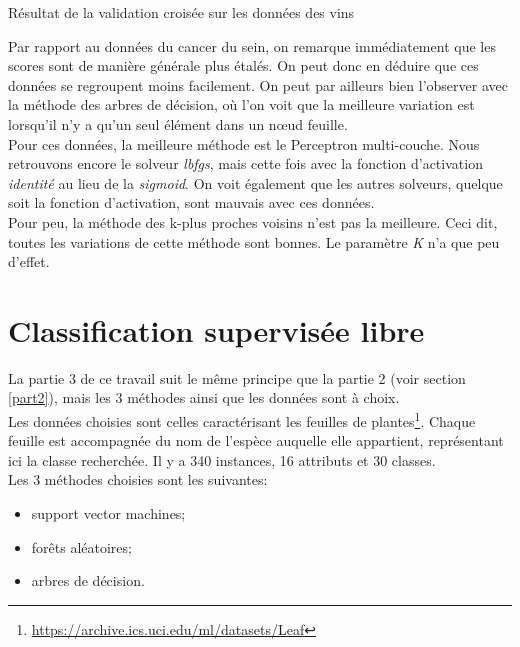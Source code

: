 \documentclass[11pt, a4paper]{article}
\begin{document}
\begin{table}[H]
    \begin{center}
    \end{center}
    \caption{Résultat de la validation croisée sur les données des vins}
    \label{Résultat de la validation croisée sur les données des vins}
\end{table}

Par rapport au données du cancer du sein,
on remarque immédiatement que les scores sont de manière générale plus étalés.
On peut donc en déduire que ces données se regroupent moins facilement.
On peut par ailleurs bien l'observer avec la méthode des arbres de décision,
où l'on voit que la meilleure variation est lorsqu'il n'y a qu'un seul élément dans un nœud feuille. \\

Pour ces données, la meilleure méthode est le Perceptron multi-couche.
Nous retrouvons encore le solveur \textit{lbfgs},
mais cette fois avec la fonction d'activation \textit{identité} au lieu de la \textit{sigmoid}.
On voit également que les autres solveurs, quelque soit la fonction d'activation, sont mauvais avec ces données. \\

Pour peu, la méthode des k-plus proches voisins n'est pas la meilleure.
Ceci dit, toutes les variations de cette méthode sont bonnes.
Le paramètre \textit{K} n'a que peu d'effet.

\newpage

\section{Classification supervisée libre}

La partie 3 de ce travail suit le même principe que la partie 2 (voir section \ref{part2}),
mais les 3 méthodes ainsi que les données sont à choix. \\

Les données choisies sont celles caractérisant les feuilles de plantes\footnote{\url{https://archive.ics.uci.edu/ml/datasets/Leaf}}.
Chaque feuille est accompagnée du nom de l'espèce auquelle elle appartient, représentant ici la classe recherchée.
Il y a 340 instances, 16 attributs et 30 classes. \\

Les 3 méthodes choisies sont les suivantes:
\begin{itemize}
    \item support vector machines;
    \item forêts aléatoires;
    \item arbres de décision. \\
\end{itemize}
\end{document}
